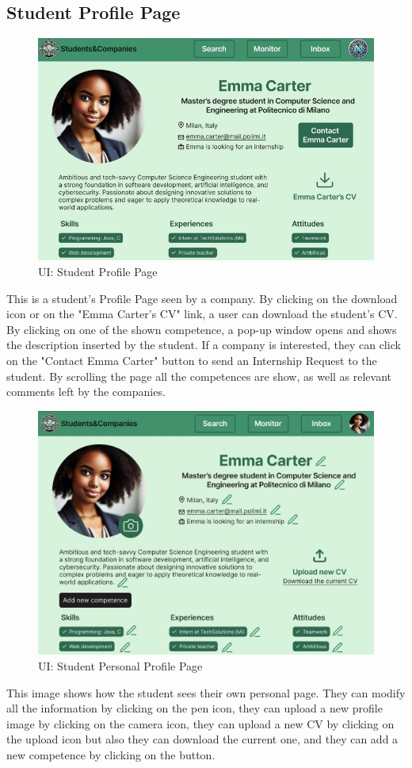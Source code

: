 \subsection{Student Profile Page}
\begin{figure}[H]
    \centering
    \includegraphics[width=15cm]{images/ui/studentprofile.jpg}
    \caption{UI: Student Profile Page}
\end{figure}
This is a student's Profile Page seen by a company. By clicking on the download icon or on the "Emma Carter's CV" link, a user can download the student's CV. By clicking on one of the shown competence, a pop-up window opens and shows the description inserted by the student. If a company is interested, they can click on the "Contact Emma Carter" button to send an Internship Request to the student. By scrolling the page all the competences are show, as well as relevant comments left by the companies.
\begin{figure}[H]
    \centering
    \includegraphics[width=15cm]{images/ui/studentprofilepersonal.jpg}
    \caption{UI: Student Personal Profile Page}
\end{figure}
This image shows how the student sees their own personal page. They can modify all the information by clicking on the pen icon, they can upload a new profile image by clicking on the camera icon, they can upload a new CV by clicking on the upload icon but also they can download the current one, and they can add a new competence by clicking on the button.

